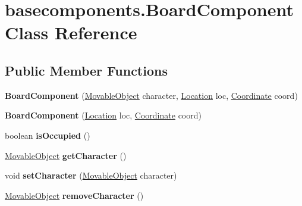 \hypertarget{classbasecomponents_1_1_board_component}{\section{basecomponents.\-Board\-Component Class Reference}
\label{classbasecomponents_1_1_board_component}
}
\subsection*{Public Member Functions}
\begin{DoxyCompactItemize}
\item 
\hypertarget{classbasecomponents_1_1_board_component_a77f8dc86525f9df62ac513bc71239ba3}{{\bfseries Board\-Component} (\hyperlink{classbasecomponents_1_1_movable_object}{Movable\-Object} character, \hyperlink{enumenums_1_1_location}{Location} loc, \hyperlink{classbasecomponents_1_1_coordinate}{Coordinate} coord)}\label{classbasecomponents_1_1_board_component_a77f8dc86525f9df62ac513bc71239ba3}

\item 
\hypertarget{classbasecomponents_1_1_board_component_a071c204bc828f06dd41b691df9756135}{{\bfseries Board\-Component} (\hyperlink{enumenums_1_1_location}{Location} loc, \hyperlink{classbasecomponents_1_1_coordinate}{Coordinate} coord)}\label{classbasecomponents_1_1_board_component_a071c204bc828f06dd41b691df9756135}

\item 
\hypertarget{classbasecomponents_1_1_board_component_a90ecceefe9013abc2df0c5f58cb486e0}{boolean {\bfseries is\-Occupied} ()}\label{classbasecomponents_1_1_board_component_a90ecceefe9013abc2df0c5f58cb486e0}

\item 
\hypertarget{classbasecomponents_1_1_board_component_a762c681925e7975640f5375fd35f59cd}{\hyperlink{classbasecomponents_1_1_movable_object}{Movable\-Object} {\bfseries get\-Character} ()}\label{classbasecomponents_1_1_board_component_a762c681925e7975640f5375fd35f59cd}

\item 
\hypertarget{classbasecomponents_1_1_board_component_a7aa9f7fddb9aedede60975fb3543977e}{void {\bfseries set\-Character} (\hyperlink{classbasecomponents_1_1_movable_object}{Movable\-Object} character)}\label{classbasecomponents_1_1_board_component_a7aa9f7fddb9aedede60975fb3543977e}

\item 
\hypertarget{classbasecomponents_1_1_board_component_abc5d16c7ac3bd212be2c562b5c31f6d2}{\hyperlink{classbasecomponents_1_1_movable_object}{Movable\-Object} {\bfseries remove\-Character} ()}\label{classbasecomponents_1_1_board_component_abc5d16c7ac3bd212be2c562b5c31f6d2}


\end{DoxyCompactItemize}

